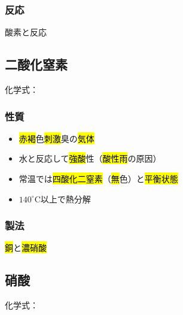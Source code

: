 \subsubsection{反応}
酸素と反応\\
\subsection{二酸化窒素}
化学式：\hl{}
\subsubsection{性質}
\begin{itemize}
  \item \hl{赤褐}色\hl{刺激}臭の\hl{気体}
  \item 水と反応して\hl{強酸}性（\hl{酸性雨}の原因）
  \item 常温では\hl{四酸化二窒素}（\hl{無}色）と\hl{平衡状態}\\
  \item $140^{\circ}$C以上で熱分解\\
\end{itemize}
\subsubsection{製法}
\hl{銅}と\hl{濃硝酸}\\
\subsection{硝酸}
化学式：\hl{}

